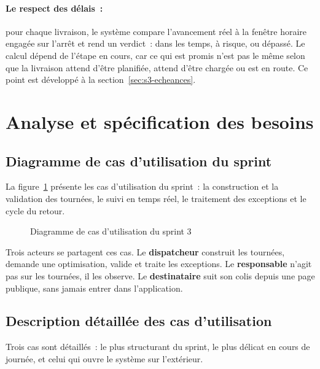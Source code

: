 \paragraph{Le respect des délais~:} pour chaque livraison, le système compare l'avancement réel à la
fenêtre horaire engagée sur l'arrêt et rend un verdict~: dans les temps, à risque, ou dépassé. Le
calcul dépend de l'étape en cours, car ce qui est promis n'est pas le même selon que la livraison
attend d'être planifiée, attend d'être chargée ou est en route. Ce point est développé à la
section~\ref{sec:s3-echeances}.

\section{Analyse et spécification des besoins}

\subsection{Diagramme de cas d'utilisation du sprint}

La figure~\ref{fig:uc-s3} présente les cas d'utilisation du sprint~: la construction et la validation
des tournées, le suivi en temps réel, le traitement des exceptions et le cycle du retour.

\begin{figure}[H]
\centering
{}
\caption{Diagramme de cas d'utilisation du sprint 3}
\label{fig:uc-s3}
\end{figure}

Trois acteurs se partagent ces cas. Le \textbf{dispatcheur} construit les tournées, demande une
optimisation, valide et traite les exceptions. Le \textbf{responsable} n'agit pas sur les tournées,
il les observe. Le \textbf{destinataire} suit son colis depuis une page publique, sans jamais entrer
dans l'application.

\subsection{Description détaillée des cas d'utilisation}

Trois cas sont détaillés~: le plus structurant du sprint, le plus délicat en cours de journée, et
celui qui ouvre le système sur l'extérieur.


